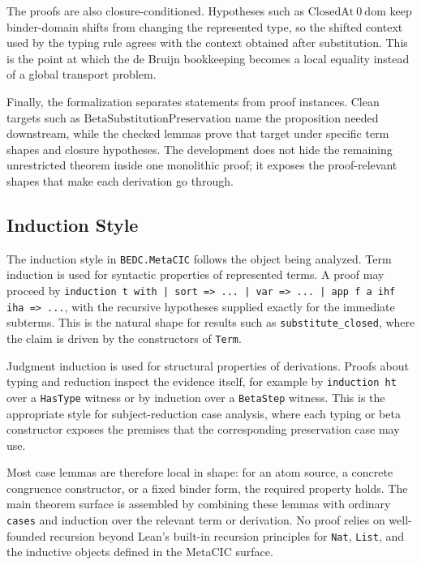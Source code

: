 The proofs are also closure-conditioned. Hypotheses such as
$\mathrm{ClosedAt}\ 0\ \mathrm{dom}$ keep binder-domain shifts from changing
the represented type, so the shifted context used by the typing rule agrees
with the context obtained after substitution. This is the point at which the
de Bruijn bookkeeping becomes a local equality instead of a global transport
problem.

Finally, the formalization separates statements from proof instances. Clean
targets such as $\mathrm{BetaSubstitutionPreservation}$ name the proposition
needed downstream, while the checked lemmas prove that target under specific
term shapes and closure hypotheses. The development does not hide the
remaining unrestricted theorem inside one monolithic proof; it exposes the
proof-relevant shapes that make each derivation go through.

\subsection{Induction Style}\label{subsec:reconstruction-induction-style}

The induction style in \texttt{BEDC.MetaCIC} follows the object being
analyzed. Term induction is used for syntactic properties of represented
terms. A proof may proceed by
\texttt{induction t with | sort => ... | var => ... | app f a ihf iha => ...},
with the recursive hypotheses supplied exactly for the immediate subterms.
This is the natural shape for results such as
\texttt{substitute\_closed}, where the claim is driven by the constructors of
\texttt{Term}.

Judgment induction is used for structural properties of derivations. Proofs
about typing and reduction inspect the evidence itself, for example by
\texttt{induction ht} over a \texttt{HasType} witness or by induction over a
\texttt{BetaStep} witness. This is the appropriate style for subject-reduction
case analysis, where each typing or beta constructor exposes the premises that
the corresponding preservation case may use.

Most case lemmas are therefore local in shape: for an atom source, a concrete
congruence constructor, or a fixed binder form, the required property holds.
The main theorem surface is assembled by combining these lemmas with ordinary
\texttt{cases} and induction over the relevant term or derivation. No proof
relies on well-founded recursion beyond Lean's built-in recursion principles
for \texttt{Nat}, \texttt{List}, and the inductive objects defined in the
MetaCIC surface.

